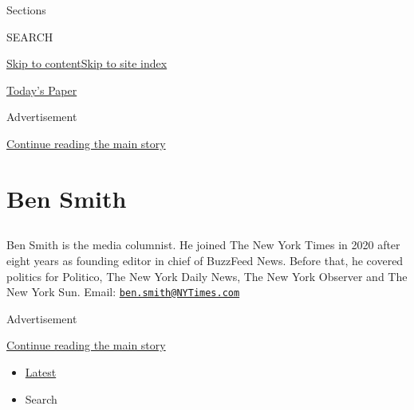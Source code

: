 Sections

SEARCH

\protect\hyperlink{site-content}{Skip to
content}\protect\hyperlink{site-index}{Skip to site index}

\href{https://myaccount.nytimes3xbfgragh.onion/auth/login?response_type=cookie\&client_id=vi}{}

\href{https://www.nytimes3xbfgragh.onion/section/todayspaper}{Today's
Paper}

Advertisement

\protect\hyperlink{after-top}{Continue reading the main story}

\hypertarget{ben-smith}{%
\section{Ben Smith}\label{ben-smith}}

\hypertarget{section}{%
\subsection{}\label{section}}

Ben Smith is the media columnist. He joined The New York Times in 2020
after eight years as founding editor in chief of BuzzFeed News. Before
that, he covered politics for Politico, The New York Daily News, The New
York Observer and The New York Sun. Email:
\href{mailto:ben.smith@NYTimes.com}{\nolinkurl{ben.smith@NYTimes.com}}

Advertisement

\protect\hyperlink{after-mid1}{Continue reading the main story}

\begin{itemize}
\tightlist
\item
  \protect\hyperlink{stream-panel}{Latest}
\item
  Search
\end{itemize}

